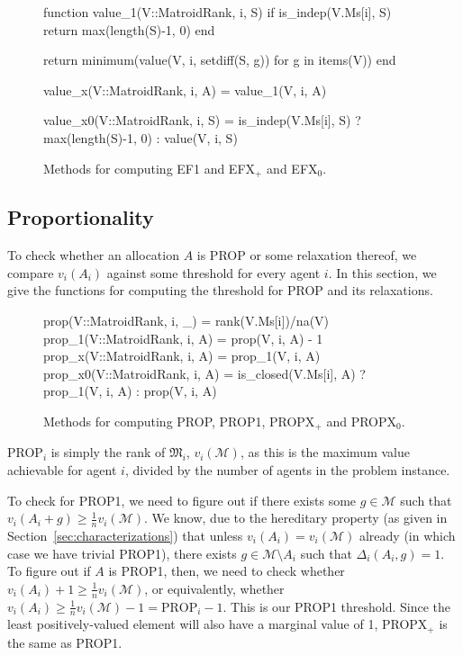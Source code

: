 \begin{figure}[ht!]
\begin{jllisting}
function value_1(V::MatroidRank, i, S)
  if is_indep(V.Ms[i], S)
    return max(length(S)-1, 0)
  end
    
  return minimum(value(V, i, setdiff(S, g)) for g in items(V))
end

value_x(V::MatroidRank, i, A) = value_1(V, i, A)

value_x0(V::MatroidRank, i, S) =
    is_indep(V.Ms[i], S) ? max(length(S)-1, 0) : value(V, i, S)
\end{jllisting}
\caption{Methods for computing EF1 and EFX$_+$ and EFX$_0$.}
\label{code:ef1_efx_efx0}
\end{figure}

\subsection*{Proportionality}
To check whether an allocation $A$ is PROP or some relaxation thereof, we compare $v_i(A_i)$ against some threshold for every agent $i$. In this section, we give the functions for computing the threshold for PROP and its relaxations.

\begin{figure}[ht!]
\begin{jllisting}
prop(V::MatroidRank, i, _) = rank(V.Ms[i])/na(V)
prop_1(V::MatroidRank, i, A) = prop(V, i, A) - 1
prop_x(V::MatroidRank, i, A) = prop_1(V, i, A)
prop_x0(V::MatroidRank, i, A) = 
    is_closed(V.Ms[i], A) ? prop_1(V, i, A) : prop(V, i, A)
\end{jllisting}
\caption{Methods for computing PROP, PROP1, PROPX$_+$ and PROPX$_0$.}
\end{figure}

PROP$_i$ is simply the rank of $\mathfrak{M}_i$, $v_i(\mathcal{M})$, as this is the maximum value achievable for agent $i$, divided by the number of agents in the problem instance.

To check for PROP1, we need to figure out if there exists some $g\in\mathcal{M}$ such that $v_i(A_i+g)\geq \frac{1}{n}v_i(\mathcal{M})$. We know, due to the hereditary property (as given in Section~\ref{sec:characterizations}) that unless $v_i(A_i) = v_i(\mathcal{M})$ already (in which case we have trivial PROP1), there exists $g\in\mathcal{M}\setminus A_i$ such that $\Delta_i(A_i, g) = 1$. To figure out if $A$ is PROP1, then, we need to check whether $v_i(A_i) + 1 \geq \frac{1}{n}v_i(\mathcal{M})$, or equivalently, whether $v_i(A_i) \geq \frac{1}{n}v_i(\mathcal{M})-1 = \text{PROP}_i - 1$. This is our PROP1 threshold. Since the least positively-valued element will also have a marginal value of 1, PROPX$_+$ is the same as PROP1.

